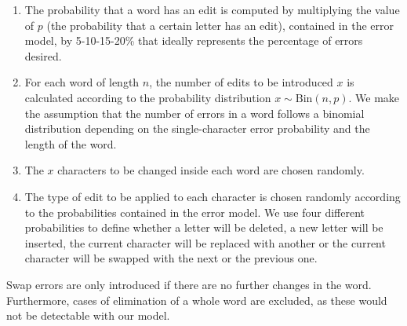 \begin{enumerate}
	\item The probability that a word has an edit is computed by multiplying the value of $p$ (the probability that a 
	certain letter has an edit), contained in the error model, by \num{5}-\num{10}-\num{15}-\num{20}\% that ideally 
	represents the percentage of errors desired.
	\item For each word of length $n$, the number of edits to be introduced $x$ is calculated according to the 
	probability distribution $x \sim \text{Bin}(n, p)$. We make the assumption that the number of errors in a word 
	follows a binomial distribution depending on the single-character error probability and the length of the word. 
	\item The $x$ characters to be changed inside each word are chosen randomly.
	\item The type of edit to be applied to each character is chosen randomly according to the probabilities contained 
	in the error model. We use four different probabilities to define whether a letter will be deleted, a new letter 
	will be inserted, the current character will be replaced with another or the current character will be swapped with 
	the next or the previous one.
	
\end{enumerate}

Swap errors are only introduced if there are no further changes in the word. Furthermore, cases of elimination of a 
whole word are excluded, as these would not be detectable with our model.



